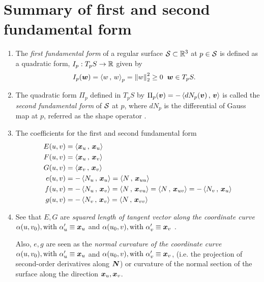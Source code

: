 \documentclass[11pt]{article}
\begin{document}
\section{Summary of first and second fundamental form}
\begin{enumerate}
\item The \emph{first fundamental form} \citep{do1976differential} of a regular surface ${\mathcal S}\subset {\mathbb R}^{3}$ at $p\in {\mathcal S}$ is defined as a  quadratic form,  $I_{p}: T_{p}S \rightarrow {\mathbb R}$ given by 
\begin{align*}
I_{p}(\boldsymbol{w}) &= \left\langle w\,,\, w \right\rangle_{p} = \left\|w\right\|_{2}^{2} \ge 0\; \; \boldsymbol{w}\in T_{p}S.
\end{align*}

\item  The quadratic form $\Pi_{p}$ defined in $T_{p}S$ by $\Pi_{p}(\boldsymbol{v}) = -\left\langle dN_{p}(\boldsymbol{v})\,,\, \boldsymbol{v} \right\rangle$ is called the \emph{second fundamental form} of ${\mathcal S}$ at $p$, where $dN_{p}$ is the differential of Gauss map at $p$, referred as the shape operator \citep{o2006elementary}. 

\item The coefficients for the first and second fundamental form
\begin{align}
E(u,v) &= \left\langle \boldsymbol{x}_{u}\,,\, \boldsymbol{x}_{u} \right\rangle \nonumber\\
F(u,v) &= \left\langle \boldsymbol{x}_{u}\,,\, \boldsymbol{x}_{v} \right\rangle \nonumber\\
G(u,v) &= \left\langle \boldsymbol{x}_{v}\,,\, \boldsymbol{x}_{v} \right\rangle \nonumber \\
e(u,v)  &=  - \left\langle N_{u}\,,\, \boldsymbol{x}_{u} \right\rangle = \left\langle N\,,\, \boldsymbol{x}_{uu} \right\rangle \nonumber\\
f(u, v)&= - \left\langle N_{u}\,,\, \boldsymbol{x}_{v} \right\rangle =  \left\langle N\,,\, \boldsymbol{x}_{vu} \right\rangle =  \left\langle N\,,\, \boldsymbol{x}_{uv} \right\rangle =  -\left\langle N_{v}\,,\, \boldsymbol{x}_{u} \right\rangle\nonumber\\
g(u, v)&=   - \left\langle N_{v}\,,\, \boldsymbol{x}_{v} \right\rangle = \left\langle N\,,\, \boldsymbol{x}_{vv} \right\rangle \label{eqn: coeff_first_sec_fund_form}
\end{align}

\item See that $E,G$ are \emph{squared length of tangent vector along the coordinate curve} $\alpha(u, v_{0}), \text{with }\alpha_{u}' \equiv \boldsymbol{x}_{u}$ and $\alpha(u_{0}, v), \text{with }\alpha_{v}' \equiv \boldsymbol{x}_{v}$ .

Also, $e, g$ are seen as the \emph{normal curvature of the coordinate curve} $\alpha(u, v_{0}), \text{with }\alpha_{u}' \equiv \boldsymbol{x}_{u}$ and $\alpha(u_{0}, v), \text{with }\alpha_{v}' \equiv \boldsymbol{x}_{v}$, (i.e. the projection of second-order derivatives along $\boldsymbol{N}$) or curvature of the normal section of the surface along the direction $\boldsymbol{x}_{u}, \boldsymbol{x}_{v}$.


\end{enumerate}
\end{document}
